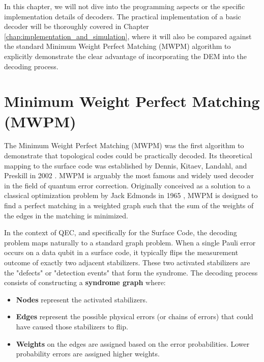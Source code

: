 In this chapter, we will not dive into the programming aspects or the specific implementation details of decoders. The practical implementation of a basic decoder will be thoroughly covered in Chapter \ref{chap:implementation_and_simulation}, where it will also be compared against the standard Minimum Weight Perfect Matching (MWPM) algorithm to explicitly demonstrate the clear advantage of incorporating the DEM into the decoding process.


\section{Minimum Weight Perfect Matching (MWPM)}
\label{sec:mwpm}

 The Minimum Weight Perfect Matching (MWPM) was the first algorithm to demonstrate that topological codes could be practically decoded. Its theoretical mapping to the surface code was established by Dennis, Kitaev, Landahl, and Preskill in 2002 \cite{dennis2002topological}. MWPM is arguably the most famous and widely used decoder in the field of quantum error correction. Originally conceived as a solution to a classical optimization problem by Jack Edmonds in 1965 \cite{edmonds1965paths}, MWPM is designed to find a perfect matching in a weighted graph such that the sum of the weights of the edges in the matching is minimized. 

In the context of QEC, and specifically for the Surface Code, the decoding problem maps naturally to a standard graph problem. When a single Pauli error occurs on a data qubit in a surface code, it typically flips the measurement outcome of exactly two adjacent stabilizers. These two activated stabilizers are the "defects" or "detection events" that form the syndrome. The decoding process consists of constructing a \textbf{syndrome graph} where:
\begin{itemize}
    \item \textbf{Nodes} represent the activated stabilizers.
    \item \textbf{Edges} represent the possible physical errors (or chains of errors) that could have caused those stabilizers to flip.
    \item \textbf{Weights} on the edges are assigned based on the error probabilities. Lower probability errors are assigned higher weights.
\end{itemize}




